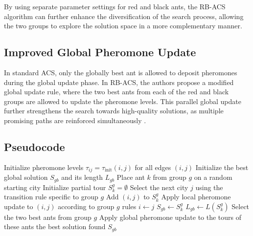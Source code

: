 By using separate parameter settings for red and black ants, the \Gls{RB-ACS} algorithm can further enhance the diversification of the search process, allowing the two groups to explore the solution space in a more complementary manner.

\subsection{Improved Global Pheromone Update}
In standard \Gls{ACS}, only the globally best ant is allowed to deposit pheromones during the global update phase. In \Gls{RB-ACS}, the authors propose a modified global update rule, where the two best ants from each of the red and black groups are allowed to update the pheromone levels. This parallel global update further strengthens the search towards high-quality solutions, as multiple promising paths are reinforced simultaneously \cite{Hassan2013}.

\subsection{Pseudocode}

\begin{algorithm}
	\caption{Red-Black Ant Colony System (\Gls{RB-ACS}) for the \Gls{TSP}}
	\begin{algorithmic}[1]
		\State Initialize pheromone levels $\tau_{ij} = \tau_{\text{init}}(i,j)$ for all edges $(i,j)$
		\State Initialize the best global solution $S_{gb}$ and its length $L_{gb}$
		\State Place ant $k$ from group $g$ on a random starting city
		\State Initialize partial tour $S_k^g = \emptyset$
		\Repeat
		\State Select the next city $j$ using the transition rule specific to group $g$
		\State Add $(i,j)$ to $S_k^g$
		\State Apply local pheromone update to $(i,j)$ according to group $g$ rules
		\State $i \gets j$
		\State $S_{gb} \gets S_k^g$
		\State $L_{gb} \gets L(S_k^g)$
		\EndIf
		\EndFor
		\EndFor
		\State Select the two best ants from group $g$
		\State Apply global pheromone update to the tours of these ants
		\EndFor
		\EndFor
		\State \Return the best solution found $S_{gb}$
	\end{algorithmic}
\end{algorithm}



